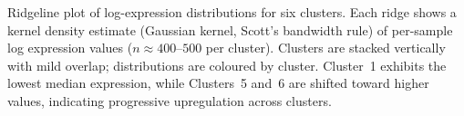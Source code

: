 \caption{Ridgeline plot of log-expression distributions for six clusters. Each ridge shows a kernel density estimate (Gaussian kernel, Scott's bandwidth rule) of per-sample log expression values ($n \approx 400$--$500$ per cluster). Clusters are stacked vertically with mild overlap; distributions are coloured by cluster. Cluster~1 exhibits the lowest median expression, while Clusters~5 and~6 are shifted toward higher values, indicating progressive upregulation across clusters.}
